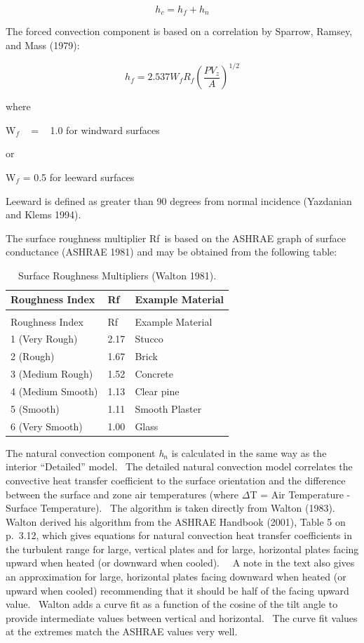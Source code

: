 \begin{equation}
{h_c} = {h_f} + {h_n}
\end{equation}

The forced convection component is based on a correlation by Sparrow, Ramsey, and Mass (1979):

\begin{equation}
{h_f} = 2.537{W_f}{R_f}{\left( {\frac{{P{V_z}}}{A}} \right)^{1/2}}
\end{equation}

where

W\(_{f}\) ~ = ~ 1.0 for windward surfaces

or

W\(_{f}\) = 0.5 for leeward surfaces

Leeward is defined as greater than 90 degrees from normal incidence (Yazdanian and Klems 1994).

The surface roughness multiplier Rf~is based on the ASHRAE graph of surface conductance (ASHRAE 1981) and may be obtained from the following table:

\begin{longtable}[c]{@{}lll@{}}
\caption{Surface Roughness Multipliers (Walton 1981). \label{table:surface-roughness-multipliers-walton-1981.}} \tabularnewline
\toprule
Roughness Index & Rf & Example Material \tabularnewline
\midrule
\endfirsthead

\caption[]{Surface Roughness Multipliers (Walton 1981).} \tabularnewline
\toprule
Roughness Index & Rf & Example Material \tabularnewline
\midrule
\endhead

1 (Very Rough) & 2.17 & Stucco \tabularnewline
2 (Rough) & 1.67 & Brick \tabularnewline
3 (Medium Rough) & 1.52 & Concrete \tabularnewline
4 (Medium Smooth) & 1.13 & Clear pine \tabularnewline
5 (Smooth) & 1.11 & Smooth Plaster \tabularnewline
6 (Very Smooth) & 1.00 & Glass \tabularnewline
\bottomrule
\end{longtable}

The natural convection component \emph{h\(_{n}\)} is calculated in the same way as the interior ``Detailed'' model.~ The detailed natural convection model correlates the convective heat transfer coefficient to the surface orientation and the difference between the surface and zone air temperatures (where $\Delta$T = Air Temperature - Surface Temperature).~ The algorithm is taken directly from Walton (1983).~ Walton derived his algorithm from the ASHRAE Handbook (2001), Table 5 on p.~3.12, which gives equations for natural convection heat transfer coefficients in the turbulent range for large, vertical plates and for large, horizontal plates facing upward when heated (or downward when cooled).~~ A note in the text also gives an approximation for large, horizontal plates facing downward when heated (or upward when cooled) recommending that it should be half of the facing upward value.~ Walton adds a curve fit as a function of the cosine of the tilt angle to provide intermediate values between vertical and horizontal.~ The curve fit values at the extremes match the ASHRAE values very well.


